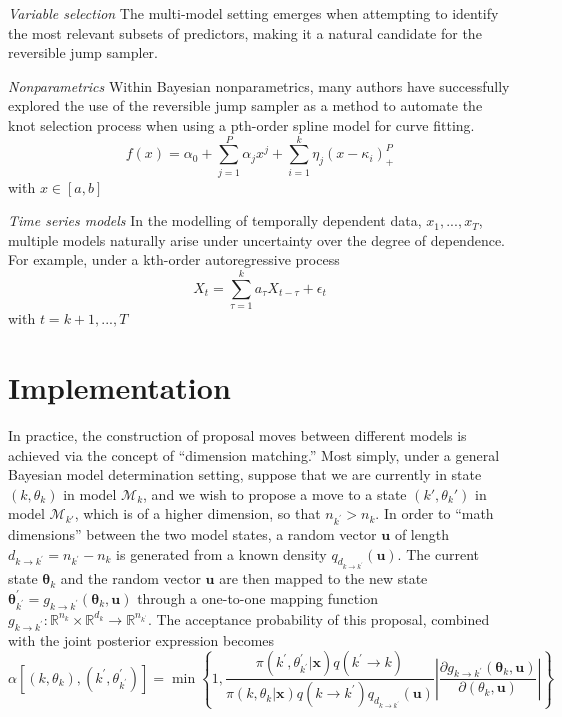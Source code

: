 \documentclass[
]{book}
\theoremstyle{definition}
\theoremstyle{definition}
\theoremstyle{definition}
\theoremstyle{remark}
\begin{document}
\emph{Variable selection} The multi-model setting emerges when attempting to identify the most relevant subsets of predictors, making it a natural candidate for the reversible jump sampler.

\emph{Nonparametrics} Within Bayesian nonparametrics, many authors have successfully explored the use of the reversible jump sampler as a method to automate the knot selection process when using a pth-order spline model for curve fitting.
\[
f(x)=\alpha_0+\sum_{j=1}^{P}\alpha_j x^j+\sum_{i=1}^k \eta_j(x-\kappa_i)^P_+ 
\]
with \(x\in[a,b]\)

\emph{Time series models} In the modelling of temporally dependent data, \(x_1,...,x_T\), multiple models naturally arise under uncertainty over the degree of dependence. For example, under a kth-order autoregressive process
\[
X_t=\sum^k_{\tau=1}a_\tau X_{t-\tau}+\epsilon_t
\]
with \(t=k+1,...,T\)

\hypertarget{implementation}{%
\section{Implementation}\label{implementation}}

In practice, the construction of proposal moves between different models is achieved via the concept of ``dimension matching.'' Most simply, under a general Bayesian model determination setting, suppose that we are currently in state \((k,\theta_k)\) in model \(\mathcal M_k\), and we wish to propose a move to a state \((k',\theta_k')\) in model \(\mathcal M_{k'}\), which is of a higher dimension, so that \(n_{k^{\prime}}>n_{k}\). In order to ``math dimensions'' between the two model states, a random vector \(\boldsymbol u\) of length \(d_{k \rightarrow k^{\prime}}=n_{k^{\prime}}-n_{k}\) is generated from a known density \(q_{d_{k \rightarrow k^{\prime}}}(\mathbf{u})\). The current state \(\boldsymbol \theta_k\) and the random vector \(\boldsymbol u\) are then mapped to the new state \(\boldsymbol{\theta}_{k^{\prime}}^{\prime}=g_{k \rightarrow k^{\prime}}\left(\boldsymbol{\theta}_{k}, \mathbf{u}\right)\) through a one-to-one mapping function \(g_{k \rightarrow k^{\prime}} : \mathbb{R}^{n_{k}} \times \mathbb{R}^{d_{k}} \rightarrow \mathbb{R}^{n_{k^{\prime}}}\). The acceptance probability of this proposal, combined with the joint posterior expression becomes
\[
\alpha\left[\left(k, \theta_{k}\right),\left(k^{\prime}, \theta_{k^{\prime}}^{\prime}\right)\right]=\min \left\{1, \frac{\pi\left(k^{\prime}, \theta_{k^{\prime}}^{\prime} | \mathbf{x}\right) q\left(k^{\prime} \rightarrow k\right)}{\pi\left(k, \theta_{k} | \mathbf{x}\right) q\left(k \rightarrow k^{\prime}\right) q_{d_{k \rightarrow k^{\prime}}}(\mathbf{u})}\left|\frac{\partial g_{k \rightarrow k^{\prime}}\left(\boldsymbol{\theta}_{k}, \mathbf{u}\right)}{\partial\left(\theta_{k}, \mathbf{u}\right)}\right|\right\}
\]
\end{document}
